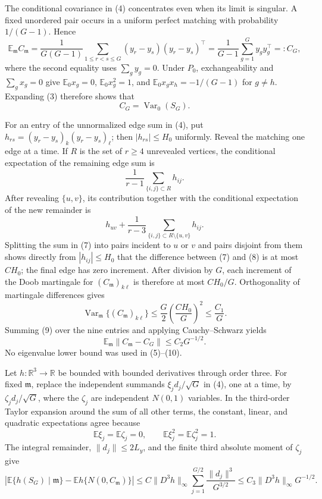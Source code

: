 The conditional covariance in (4) concentrates even when its limit is singular.  A fixed unordered pair occurs in a uniform perfect matching with probability \(1/(G-1)\).  Hence
\[
 \mathbb E_{\mathfrak m}C_{\mathfrak m}
 =\frac1{G(G-1)}\sum_{1\leq r<s\leq G}(y_r-y_s)(y_r-y_s)^\top
 =\frac1{G-1}\sum_{g=1}^Gy_gy_g^\top=:C_G,                              \tag{5}
\]
where the second equality uses \(\sum_gy_g=0\).  Under \(P_0\), exchangeability and \(\sum_gx_g=0\) give
\(
 \mathbb E_0x_g=0
\),
\(
 \mathbb E_0x_g^2=1
\), and
\(
 \mathbb E_0x_gx_h=-1/(G-1)
\)
for \(g\ne h\).  Expanding (3) therefore shows that
\[
 C_G=\operatorname{Var}_0(S_G).                                          \tag{6}
\]

For an entry of the unnormalized edge sum in (4), put
\(
 h_{rs}=(y_r-y_s)_k(y_r-y_s)_\ell
\); then \(|h_{rs}|\leq H_0\) uniformly.  Reveal the matching one edge at a time.  If \(R\) is the set of \(r\geq4\) unrevealed vertices, the conditional expectation of the remaining edge sum is
\[
 \frac1{r-1}\sum_{\{i,j\}\subset R}h_{ij}.                              \tag{7}
\]
After revealing \(\{u,v\}\), its contribution together with the conditional expectation of the new remainder is
\[
 h_{uv}+\frac1{r-3}
       \sum_{\{i,j\}\subset R\setminus\{u,v\}}h_{ij}.                  \tag{8}
\]
Splitting the sum in (7) into pairs incident to \(u\) or \(v\) and pairs disjoint from them shows directly from \(|h_{ij}|\leq H_0\) that the difference between (7) and (8) is at most \(C H_0\); the final edge has zero increment.  After division by \(G\), each increment of the Doob martingale for \((C_{\mathfrak m})_{k\ell}\) is therefore at most \(C H_0/G\).  Orthogonality of martingale differences gives
\[
 \operatorname{Var}_{\mathfrak m}\{(C_{\mathfrak m})_{k\ell}\}
 \leq \frac G2\left(\frac{C H_0}{G}\right)^2
 \leq \frac{C_1}{G}.                                                     \tag{9}
\]
Summing (9) over the nine entries and applying Cauchy--Schwarz yields
\[
 \mathbb E_{\mathfrak m}\|C_{\mathfrak m}-C_G\|\leq C_2G^{-1/2}.       \tag{10}
\]
No eigenvalue lower bound was used in (5)--(10).

Let \(h:\mathbb R^3\to\mathbb R\) be bounded with bounded derivatives through order three.  For fixed \(\mathfrak m\), replace the independent summands \(\xi_jd_j/\sqrt G\) in (4), one at a time, by \(\zeta_jd_j/\sqrt G\), where the \(\zeta_j\) are independent \(N(0,1)\) variables.  In the third-order Taylor expansion around the sum of all other terms, the constant, linear, and quadratic expectations agree because
\[
 \mathbb E\xi_j=\mathbb E\zeta_j=0,
 \qquad
 \mathbb E\xi_j^2=\mathbb E\zeta_j^2=1.                                \tag{11}
\]
The integral remainder, \(\|d_j\|\leq2L_y\), and the finite third absolute moment of \(\zeta_j\) give
\[
 \left|\mathbb E\{h(S_G)\mid\mathfrak m\}
       -\mathbb Eh\{N(0,C_{\mathfrak m})\}\right|
 \leq C\|D^3h\|_\infty
       \sum_{j=1}^{G/2}\frac{\|d_j\|^3}{G^{3/2}}
 \leq C_3\|D^3h\|_\infty G^{-1/2}.                                    \tag{12}
\]


